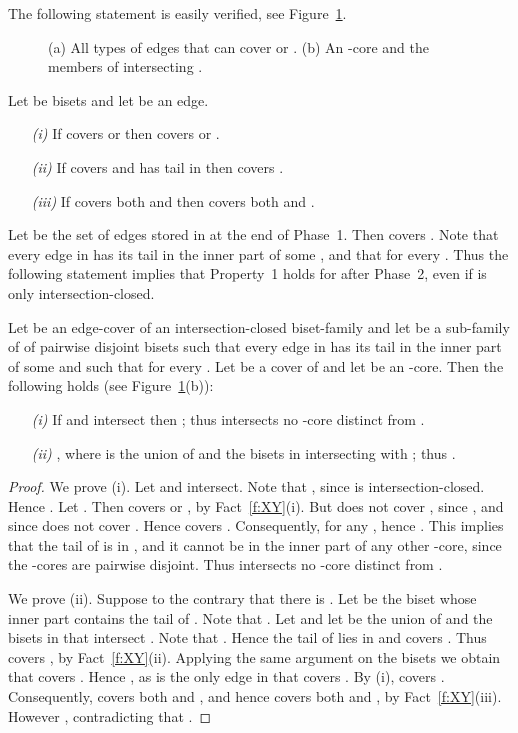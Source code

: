 The following statement is easily verified, see Figure~\ref{f:sets}.

\begin {figure} 
\centering 
{}
   \caption {(a) All types of edges that can cover  or . 
             (b) An -core  and the members of  intersecting .
            }
   \label{f:sets}
\end {figure}

\begin{fact} \label{f:XY}
Let  be bisets and let  be an edge. 
\begin{itemize}
\item[{\em (i)}]
If  covers  or  then  covers  or .
\item[{\em (ii)}]
If  covers  and has tail in  then  covers . 
\item[{\em (iii)}]
If  covers both  and  then  covers both  and .
\end{itemize}
\end{fact}

Let  be the set of edges stored in  at the end of Phase~1.
Then  covers . Note that every edge in  
has its tail in the inner part of some , and that 
 for every .
Thus the following statement implies that Property~1 holds for  after Phase~2, 
even if  is only intersection-closed.

\begin{lemma}
Let  be an edge-cover of an intersection-closed biset-family  and let
 be a sub-family of  of pairwise disjoint bisets 
such that every edge in  has its tail in the inner part of some  and
such that  for every .
Let  be a cover of  and let  be an -core.
Then the following holds (see Figure~\ref{f:sets}(b)):
\begin{itemize}
\item[{\em (i)}]
If  and  intersect then ;
thus  intersects no -core distinct from .
\item[{\em (ii)}]
, where  is the union of  
and the bisets in  intersecting with ;
thus .
\end{itemize}
\end{lemma}
\begin{proof}
We prove (i). Let  and  intersect.  
Note that , since  is intersection-closed.
Hence .
Let .
Then  covers  or , by Fact~\ref{f:XY}(i).
But  does not cover , since , and since  does not 
cover . Hence  covers . 
Consequently,  for any ,
hence .
This implies that the tail of  is in , and it cannot be in the inner part of 
any other -core, since the -cores are pairwise disjoint.
Thus  intersects no -core distinct from .

We prove (ii). 
Suppose to the contrary that there is .
Let  be the biset whose inner part contains the tail of .
Note that .
Let  and 
let  be the union of  and the bisets in 
that intersect . Note that .
Hence the tail of  lies in  and  covers .
Thus  covers , by Fact~\ref{f:XY}(ii).
Applying the same argument on the bisets  we obtain that  covers .
Hence , as  is the only edge in  that covers .
By (i),  covers .
Consequently,  covers both  and ,
and hence  covers both  and , by Fact~\ref{f:XY}(iii).
However , contradicting that .
\end{proof}

